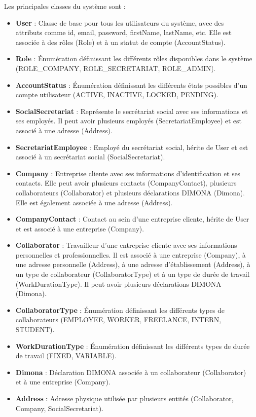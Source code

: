 \documentclass[12pt,a4paper]{report}
\begin{document}
Les principales classes du système sont :

\begin{itemize}
  \item \textbf{User} : Classe de base pour tous les utilisateurs du système, avec des attributs comme id, email, password, firstName, lastName, etc. Elle est associée à des rôles (Role) et à un statut de compte (AccountStatus).

  \item \textbf{Role} : Énumération définissant les différents rôles disponibles dans le système (ROLE\_COMPANY, ROLE\_SECRETARIAT, ROLE\_ADMIN).

  \item \textbf{AccountStatus} : Énumération définissant les différents états possibles d'un compte utilisateur (ACTIVE, INACTIVE, LOCKED, PENDING).

  \item \textbf{SocialSecretariat} : Représente le secrétariat social avec ses informations et ses employés. Il peut avoir plusieurs employés (SecretariatEmployee) et est associé à une adresse (Address).

  \item \textbf{SecretariatEmployee} : Employé du secrétariat social, hérite de User et est associé à un secrétariat social (SocialSecretariat).

  \item \textbf{Company} : Entreprise cliente avec ses informations d'identification et ses contacts. Elle peut avoir plusieurs contacts (CompanyContact), plusieurs collaborateurs (Collaborator) et plusieurs déclarations DIMONA (Dimona). Elle est également associée à une adresse (Address).

  \item \textbf{CompanyContact} : Contact au sein d'une entreprise cliente, hérite de User et est associé à une entreprise (Company).

  \item \textbf{Collaborator} : Travailleur d'une entreprise cliente avec ses informations personnelles et professionnelles. Il est associé à une entreprise (Company), à une adresse personnelle (Address), à une adresse d'établissement (Address), à un type de collaborateur (CollaboratorType) et à un type de durée de travail (WorkDurationType). Il peut avoir plusieurs déclarations DIMONA (Dimona).

  \item \textbf{CollaboratorType} : Énumération définissant les différents types de collaborateurs (EMPLOYEE, WORKER, FREELANCE, INTERN, STUDENT).

  \item \textbf{WorkDurationType} : Énumération définissant les différents types de durée de travail (FIXED, VARIABLE).

  \item \textbf{Dimona} : Déclaration DIMONA associée à un collaborateur (Collaborator) et à une entreprise (Company).

  \item \textbf{Address} : Adresse physique utilisée par plusieurs entités (Collaborator, Company, SocialSecretariat).
\end{itemize}
\end{document}
